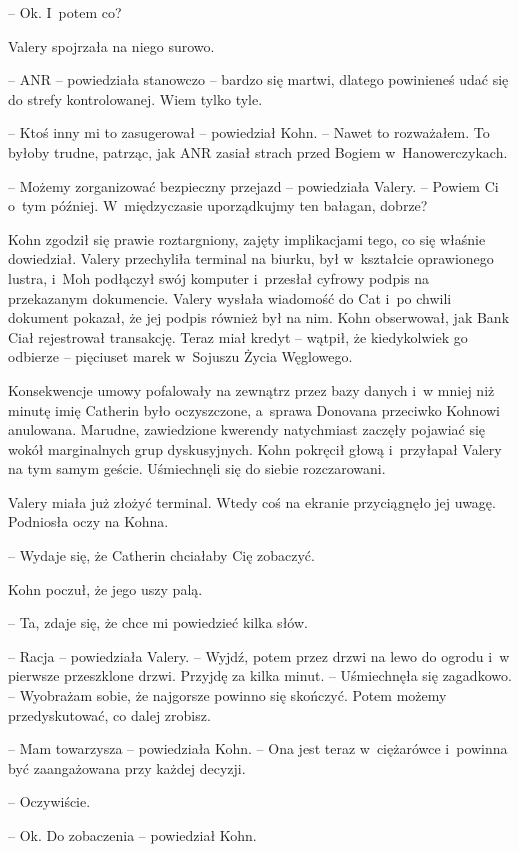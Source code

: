 \documentclass[oneside,polish,11pt,sfheadings]{mwbk}
\begin{document}
-- Ok. I~potem co?

Valery spojrzała na niego surowo. 

-- ANR -- powiedziała stanowczo -- bardzo
się martwi, dlatego powinieneś udać się do strefy kontrolowanej. Wiem
tylko tyle.

-- Ktoś inny mi to zasugerował -- powiedział Kohn. -- Nawet to rozważałem.
To byłoby trudne, patrząc, jak ANR zasiał strach przed Bogiem w~Hanowerczykach.

-- Możemy zorganizować bezpieczny przejazd -- powiedziała Valery. -- Powiem
Ci o~tym później. W~międzyczasie uporządkujmy ten bałagan, dobrze?

Kohn zgodził się prawie roztargniony, zajęty implikacjami tego, co się
właśnie dowiedział. Valery przechyliła terminal na biurku, był w~kształcie oprawionego lustra, i~Moh podłączył swój komputer i~przesłał
cyfrowy podpis na przekazanym dokumencie. Valery wysłała wiadomość do
Cat i~po chwili dokument pokazał, że jej podpis również był na nim. Kohn
obserwował, jak Bank Ciał rejestrował transakcję. Teraz miał kredyt -- wątpił, że kiedykolwiek go odbierze -- pięciuset marek w~Sojuszu Życia
Węglowego.

Konsekwencje umowy pofalowały na zewnątrz przez bazy danych i~w mniej
niż minutę imię Catherin było oczyszczone, a~sprawa Donovana przeciwko
Kohnowi anulowana. Marudne, zawiedzione kwerendy natychmiast zaczęły
pojawiać się wokół marginalnych grup dyskusyjnych. Kohn pokręcił głową i~przyłapał Valery na tym samym geście. Uśmiechnęli się do siebie
rozczarowani.

Valery miała już złożyć terminal. Wtedy coś na ekranie przyciągnęło jej
uwagę. Podniosła oczy na Kohna.

-- Wydaje się, że Catherin chciałaby Cię zobaczyć.

Kohn poczuł, że jego uszy palą. 

-- Ta, zdaje się, że chce mi powiedzieć
kilka słów.

-- Racja -- powiedziała Valery. -- Wyjdź, potem przez drzwi na lewo do
ogrodu i~w pierwsze przeszklone drzwi. Przyjdę za kilka minut. -- Uśmiechnęła się zagadkowo. -- Wyobrażam sobie, że najgorsze powinno się
skończyć. Potem możemy przedyskutować, co dalej zrobisz.

-- Mam towarzysza -- powiedziała Kohn. -- Ona jest teraz w~ciężarówce i~powinna być zaangażowana przy każdej decyzji.

-- Oczywiście.

-- Ok. Do zobaczenia -- powiedział Kohn.
\end{document}
